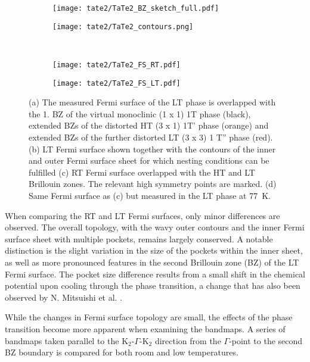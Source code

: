 \begin{figure}[t!]
	\centering
	\begin{subfigure}[b]{0.49\textwidth}
		\texttt{[image: tate2/TaTe2\_BZ\_sketch\_full.pdf]}
		\caption{}
	\end{subfigure}
	\hfill
	\begin{subfigure}[b]{0.49\textwidth}
		\texttt{[image: tate2/TaTe2\_contours.png]}
		\caption{}
	\end{subfigure}
	\\
	\begin{subfigure}[b]{0.49\textwidth}
		\texttt{[image: tate2/TaTe2\_FS\_RT.pdf]}
		\caption{}
	\end{subfigure}
	\hfill
	\begin{subfigure}[b]{0.49\textwidth}
		\texttt{[image: tate2/TaTe2\_FS\_LT.pdf]}
		\caption{}
	\end{subfigure}
	\caption{(a) The measured Fermi surface of the LT phase is overlapped with the 1. BZ of the virtual monoclinic (1 x 1) 1T phase (black), extended BZs of the distorted HT (3 x 1) 1T' phase (orange) and extended BZs of the further distorted LT (3 x 3) 1 T'' phase (red). (b) LT Fermi surface shown together with the contours of the inner and outer Fermi surface sheet for which nesting conditions can be fulfilled (c) RT Fermi surface overlapped with the HT and LT Brillouin zones. The relevant high symmetry points are marked. (d) Same Fermi surface as (c) but measured in the LT phase at \qty{77}{\kelvin}.}
	\label{fig:TaTe_FS}
\end{figure}

When comparing the RT and LT Fermi surfaces, only minor differences are observed.
The overall topology, with the wavy outer contours and the inner Fermi surface sheet with multiple pockets, remains largely conserved.
A notable distinction is the slight variation in the size of the pockets within the inner sheet, as well as more pronounced features in the second Brillouin zone (BZ) of the LT Fermi surface.
The pocket size difference results from a small shift in the chemical potential upon cooling through the phase transition, a change that has also been observed by N. Mitsuishi et al. \cite{mitsuishi_unveiling_2024}.

While the changes in Fermi surface topology are small, the effects of the phase transition become more apparent when examining the bandmaps.
A series of bandmaps taken parallel to the K$_2$-$\Gamma$-K$_2$ direction from the $\Gamma$-point to the second BZ boundary is compared for both room and low temperatures.

